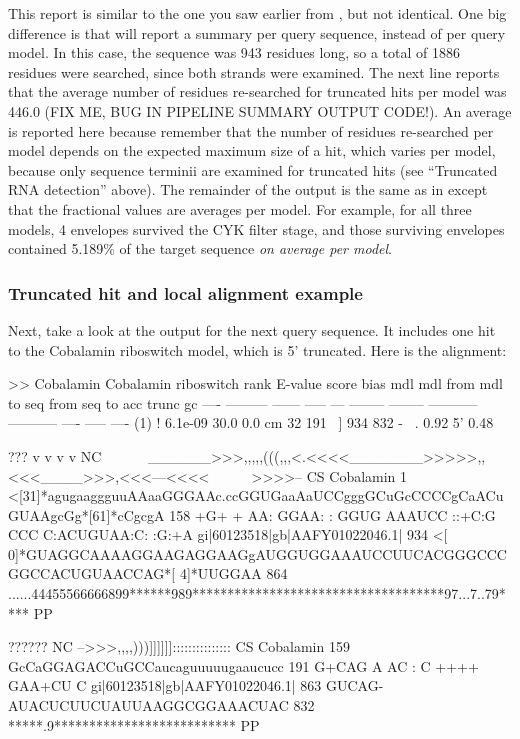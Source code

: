 This report is similar to the one you saw earlier from
, but not identical. One big difference is that
 will report a summary per query sequence, instead of per
query model. In this case, the sequence was 943 residues long, so a
total of 1886 residues were searched, since both strands were
examined. The next line reports that the average number of residues
re-searched for truncated hits per model was 446.0 (FIX ME, BUG IN
PIPELINE SUMMARY OUTPUT CODE!). An average is reported here because
remember that the number of residues re-searched per model depends on
the expected maximum size of a hit, which varies per model, because
only sequence terminii are examined for truncated hits (see
``Truncated RNA detection'' above).  The remainder of the output is
the same as in  except that the fractional values are
averages per model. For example, for all three models, 4 envelopes
survived the CYK filter stage, and those surviving envelopes contained
5.189\% of the target sequence \emph{on average per model}.

\subsubsection{Truncated hit and local alignment example}
Next, take a look at the  output for the next query
sequence. It includes one hit to the Cobalamin riboswitch model, which
is 5' truncated. Here is the alignment:

\begin{sreoutput}
>> Cobalamin  Cobalamin riboswitch
 rank     E-value  score  bias mdl mdl from   mdl to       seq from      seq to       acc trunc   gc
 ----   --------- ------ ----- --- -------- --------    ----------- -----------      ---- ----- ----
  (1) !   6.1e-09   30.0   0.0  cm       32      191 ~]         934         832 - ~. 0.92    5' 0.48

                                                 ???              v           v      v    v                          NC
                                     ~~~~~~______>>>,,,,,(((,,,<.<<<<_______>>>>>,,<<<____>>>,<<<---<<<<~~~~~~>>>>-- CS
                       Cobalamin   1 <[31]*agugaaggguuAAaaGGGAAc.ccGGUGaaAaUCCgggGCuGcCCCCgCaACuGUAAgcGg*[61]*cCgcgA 158
                                             +G+     + AA: GGAA: : GGUG AAAUCC ::+C:G CCC  C:ACUGUAA:C:        :G:+A
  gi|60123518|gb|AAFY01022046.1| 934 <[ 0]*GUAGGCAAAAGGAAGAGGAAGgAUGGUGGAAAUCCUUCACGGGCCCGGCCACUGUAACCAG*[ 4]*UUGGAA 864
                                     ......44455566666899******989************************************97...7..79**** PP

                                                 ??????                NC
                                     -->>>,,,,)))]]]]]]::::::::::::::: CS
                       Cobalamin 159 GcCaGGAGACCuGCCaucaguuuuugaaucucc 191
                                     G+CAG A AC :  C   ++++   GAA+CU C
  gi|60123518|gb|AAFY01022046.1| 863 GUCAG-AUACUCUUCUAUUAAGGCGGAAACUAC 832
                                     *****.9************************** PP
\end{sreoutput}

